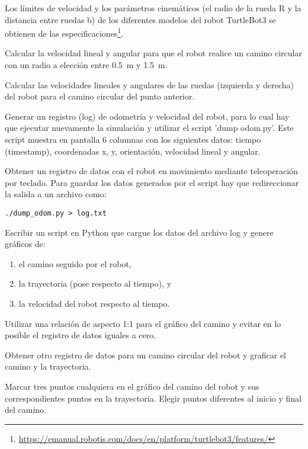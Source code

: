 \documentclass[tp]{lcc}
\begin{document}
	\begin{nota}
		Los límites de velocidad y los parámetros cinemáticos (el radio de la rueda R y la distancia entre ruedas b) de los diferentes modelos del robot TurtleBot3 se obtienen de las especificaciones\footnote{\url{https://emanual.robotis.com/docs/en/platform/turtlebot3/features/}}.
	\end{nota}
	
	\ejercicio  Calcular la velocidad lineal y angular para que el robot realice un camino circular con un radio a elección entre \SI{0.5}{\meter} y \SI{1.5}{\meter}.
	
	\ejercicio  Calcular las velocidades lineales y angulares de las ruedas (izquierda y derecha) del robot para el camino circular del punto anterior.
	
	\ejercicio Generar un registro (log) de odometría y velocidad del robot, para lo cual hay que ejecutar nuevamente
	la simulación y utilizar el script ’dump odom.py’. Este script muestra en pantalla 6 columnas con los siguientes datos: tiempo (timestamp), coordenadas x, y, orientación, velocidad lineal y angular.
	
	\ejercicio Obtener un registro de datos con el robot en movimiento mediante teleoperación por teclado. Para guardar los datos generados por el script hay que redireccionar la salida a un archivo como:
	
	\begin{lstlisting}[style=bash] 
		./dump_odom.py > log.txt
	\end{lstlisting}
	
	\ejercicio Escribir un script en Python que cargue los datos del archivo log y genere gráficos de:
	\begin{enumerate}
		\item el camino seguido por el robot,
		\item la trayectoria (pose respecto al tiempo), y
		\item la velocidad del robot respecto al tiempo.
	\end{enumerate} 
	
	\begin{nota}
		Utilizar una relación de aspecto 1:1 para el gráfico del camino y evitar en lo posible el registro de datos iguales a cero.
	\end{nota}
	
	\ejercicio Obtener otro registro de datos para un camino circular del robot y graficar el camino y la trayectoria.
	
	\ejercicio Marcar tres puntos cualquiera en el gráfico del camino del robot y sus correspondientes puntos en la trayectoria. Elegir puntos diferentes al inicio y final del camino.
	
\end{document}

